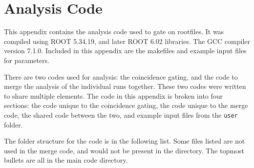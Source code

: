 %
%
%
%
%
%
%
%
%
%


%
%

\chapter{Analysis Code}

This appendix contains the analysis code used to gate on rootfiles. It was compiled using ROOT 5.34.19, and later ROOT 6.02 libraries. The GCC compiler version 7.1.0. Included in this appendix are the makefiles and example input files for parameters.

There are two codes used for analysis: the coincidence gating, and the code to merge the analysis of the individual runs together. These two codes were written to share multiple elements. The code in this appendix is broken into four sections: the code unique to the coincidence gating, the code unique to the merge code, the shared code between the two, and example input files from the \texttt{user} folder.

The folder structure for the code is in the following list. Some files listed are not used in the merge code, and would not be present in the directory. The topmost bullets are all in the main code directory. 

